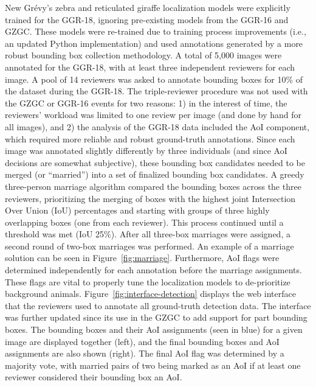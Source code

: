 New Gr\'evy's zebra and reticulated giraffe localization models were explicitly trained for the GGR-18, ignoring pre-existing models from the GGR-16 and GZGC.  These models were re-trained due to training process improvements (i.e., an updated Python implementation) and used annotations generated by a more robust bounding box collection methodology.  A total of 5,000 images were annotated for the GGR-18, with at least three independent reviewers for each image.  A pool of 14 reviewers was asked to annotate bounding boxes for 10\% of the dataset during the GGR-18.  The triple-reviewer procedure was not used with the GZGC or GGR-16 events for two reasons: 1) in the interest of time, the reviewers' workload was limited to one review per image (and done by hand for all images), and 2) the analysis of the GGR-18 data included the AoI component, which required more reliable and robust ground-truth annotations.  Since each image was annotated slightly differently by three individuals (and since AoI decisions are somewhat subjective), these bounding box candidates needed to be merged (or ``married'') into a set of finalized bounding box candidates.  A greedy three-person marriage algorithm compared the bounding boxes across the three reviewers, prioritizing the merging of boxes with the highest joint Intersection Over Union (IoU) percentages and starting with groups of three highly overlapping boxes (one from each reviewer).  This process continued until a threshold was met (IoU 25\%).  After all three-box marriages were assigned, a second round of two-box marriages was performed.  An example of a marriage solution can be seen in Figure~\ref{fig:marriage}.  Furthermore, AoI flags were determined independently for each annotation before the marriage assignments.  These flags are vital to properly tune the localization models to de-prioritize background animals.  Figure~\ref{fig:interface-detection} displays the web interface that the reviewers used to annotate all ground-truth detection data.  The interface was further updated since its use in the GZGC to add support for part bounding boxes.  The bounding boxes and their AoI assignments (seen in blue) for a given image are displayed together (left), and the final bounding boxes and AoI assignments are also shown (right).  The final AoI flag was determined by a majority vote, with married pairs of two being marked as an AoI if at least one reviewer considered their bounding box an AoI.

